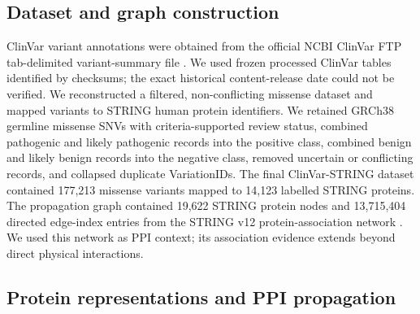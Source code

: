 \documentclass[conference]{IEEEtran}
\begin{document}
\subsection{Dataset and graph construction}

ClinVar variant annotations were obtained from the official NCBI ClinVar FTP tab-delimited variant-summary file \cite{Landrum2020ClinVar}. We used frozen processed ClinVar tables identified by checksums; the exact historical content-release date could not be verified. We reconstructed a filtered, non-conflicting missense dataset and mapped variants to STRING human protein identifiers. We retained GRCh38 germline missense SNVs with criteria-supported review status, combined pathogenic and likely pathogenic records into the positive class, combined benign and likely benign records into the negative class, removed uncertain or conflicting records, and collapsed duplicate VariationIDs. The final ClinVar-STRING dataset contained 177,213 missense variants mapped to 14,123 labelled STRING proteins. The propagation graph contained 19,622 STRING protein nodes and 13,715,404 directed edge-index entries from the STRING v12 protein-association network \cite{Szklarczyk2023STRING}. We used this network as PPI context; its association evidence extends beyond direct physical interactions.

\subsection{Protein representations and PPI propagation}
\end{document}
